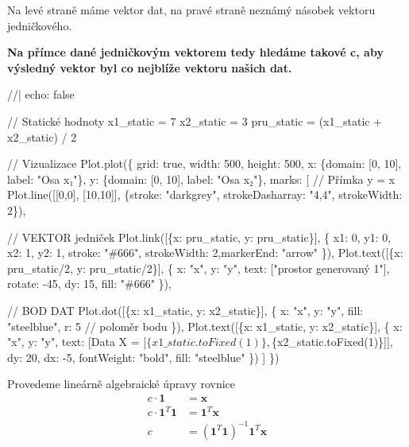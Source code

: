 \documentclass[
  czech,
  11pt,
  letterpaper,
  DIV=11,
  numbers=noendperiod]{scrreprt}
\newenvironment{Shaded}{\begin{snugshade}}{\end{snugshade}}
\newcommand{\NormalTok}[1]{\textcolor[rgb]{0.00,0.23,0.31}{#1}}
\begin{document}
\begin{tcolorbox}
Na levé straně máme vektor dat, na pravé straně neznámý násobek vektoru
jedničkového.

\textbf{Na přímce dané jedničkovým vektorem tedy hledáme takové c, aby
výsledný vektor byl co nejblíže vektoru našich dat.}

\begin{Shaded}
\begin{Highlighting}[]
\NormalTok{//| echo: false}

\NormalTok{// Statické hodnoty}
\NormalTok{x1\_static = 7}
\NormalTok{x2\_static = 3}
\NormalTok{pru\_static = (x1\_static + x2\_static) / 2}

\NormalTok{// Vizualizace}
\NormalTok{Plot.plot(\{}
\NormalTok{  grid: true,}
\NormalTok{  width: 500,}
\NormalTok{  height: 500,}
\NormalTok{  x: \{domain: [0, 10], label: "Osa x₁"\},}
\NormalTok{  y: \{domain: [0, 10], label: "Osa x₂"\},}
\NormalTok{  marks: [}
\NormalTok{    // Přímka y = x}
\NormalTok{    Plot.line([[0,0], [10,10]], \{stroke: "darkgrey", strokeDasharray: "4,4", strokeWidth: 2\}),}
    
\NormalTok{    // VEKTOR jedniček}
\NormalTok{    Plot.link([\{x: pru\_static, y: pru\_static\}], \{}
\NormalTok{      x1: 0, y1: 0, x2: 1, y2: 1, }
\NormalTok{      stroke: "\#666", strokeWidth: 2,markerEnd: "arrow"}
\NormalTok{    \}),}
\NormalTok{    Plot.text([\{x: pru\_static/2, y: pru\_static/2\}], \{}
\NormalTok{      x: "x", y: "y", text: ["prostor generovaný 1"], }
\NormalTok{      rotate: {-}45, dy: 15, fill: "\#666"}
\NormalTok{    \}),}
    
\NormalTok{    // BOD DAT}
\NormalTok{    Plot.dot([\{x: x1\_static, y: x2\_static\}], \{}
\NormalTok{      x: "x", y: "y",}
\NormalTok{      fill: "steelblue",}
\NormalTok{      r: 5  // poloměr bodu}
\NormalTok{    \}),}
\NormalTok{    Plot.text([\{x: x1\_static, y: x2\_static\}], \{}
\NormalTok{      x: "x", }
\NormalTok{      y: "y", }
\NormalTok{      text: [\textasciigrave{}Data X = [$\{x1\_static.toFixed(1)\}, $\{x2\_static.toFixed(1)\}]\textasciigrave{}], }
\NormalTok{      dy: 20, dx: {-}5, }
\NormalTok{      fontWeight: "bold",}
\NormalTok{      fill: "steelblue"}
\NormalTok{    \})}
\NormalTok{  ]}
\NormalTok{\})}
\end{Highlighting}
\end{Shaded}

Provedeme lineárně algebraické úpravy rovnice\\
\begin{align} 
    c \cdot\mathbf{1} &=\mathbf{x} \\
    c \cdot\mathbf{1}^T \mathbf{1} &=\mathbf{1}^T\mathbf{x} \\
    c &= (\mathbf{1}^T \mathbf{1})^{-1}\mathbf{1}^T\mathbf{x}
  \end{align}


\end{tcolorbox}
\end{document}
